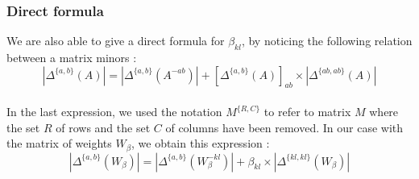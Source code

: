 \documentclass[a4paper,10pt]{article}
\begin{document}
 \subsubsection{Direct formula}
 We are also able to give a direct formula for $\beta_{kl}$, by noticing the following relation between a matrix minors :
 \[|\Delta^{\{a,b\}}(A)|=|\Delta^{\{a,b\}}(A^{- ab})| + [\Delta^{\{a,b\}}(A)]_{ab}\times |\Delta^{\{ab,ab\}}(A)|\]\\
In the last expression, we used the notation $M^{\{R,C\}}$ to refer to matrix $M$ where the set $R$ of rows and the set $C$ of columns
have been removed. In our case with the matrix of weights $W_\beta$, we obtain this expression :
\[|\Delta^{\{a,b\}}(W_\beta)|=|\Delta^{\{a,b\}}(W_\beta^{- kl})| + \beta_{kl}\times |\Delta^{\{kl,kl\}}(W_\beta)|\]\\
\end{document}

